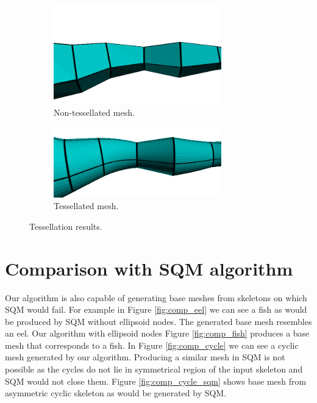 \begin{figure}[h]
        \centering
        \begin{subfigure}[b]{0.4\textwidth}
        	\centering
                \includegraphics[width=0.8\textwidth]{images/not_tessellated_mesh.png}
                \caption{Non-tessellated mesh.}
                \label{fig:no_tess}
        \end{subfigure}
        \qquad %
        \begin{subfigure}[b]{0.4\textwidth}
        	\centering
                \includegraphics[width=0.8\textwidth]{images/tessellated_mesh.png}
                \caption{Tessellated mesh.}
                \label{fig:tess}
        \end{subfigure}
        \caption[Tessellation results]{Tessellation results.}\label{fig:tes_notess}
\end{figure}

\section{Comparison with SQM algorithm}

Our algorithm is also capable of generating base meshes from skeletons on which SQM would fail.
For example in Figure \ref{fig:comp_eel} we can see a fish as would be produced by SQM without ellipsoid nodes.
The generated base mesh resembles an eel.
Our algorithm with ellipsoid nodes Figure \ref{fig:comp_fish} produces a base mesh that corresponds to a fish.
In Figure \ref{fig:comp_cycle} we can see a cyclic mesh generated by our algorithm.
Producing a similar mesh in SQM is not possible as the cycles do not lie in symmetrical region of the input skeleton and SQM would not close them.
Figure \ref{fig:comp_cycle_sqm} shows base mesh from asymmetric cyclic skeleton as would be generated by SQM.

